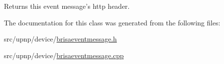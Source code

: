 Returns this event message's http header. 

The documentation for this class was generated from the following files:\begin{DoxyCompactItemize}
\item 
src/upnp/device/\hyperlink{brisaeventmessage_8h}{brisaeventmessage.h}\item 
src/upnp/device/\hyperlink{brisaeventmessage_8cpp}{brisaeventmessage.cpp}\end{DoxyCompactItemize}
